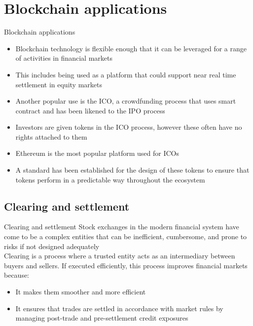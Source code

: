 \documentclass[11pt]{beamer}
\begin{document}
\section{Blockchain applications}

\begin{frame}
	\begin{center}
		\begin{large}
			Blockchain applications
		\end{large}
	\end{center}
\end{frame}


\begin{frame}{}
	\begin{itemize}
		\item Blockchain technology is flexible enough that it can be leveraged for a range of activities in financial markets
		\item This includes being used as a platform that could support near real time settlement in equity markets
		\item Another popular use is the ICO, a crowdfunding process that uses smart contract and has been likened to the IPO process
		\item Investors are given tokens in the ICO process, however these often have no rights attached to them
		\item Ethereum is the most popular platform used for ICOs
		\item A standard has been established for the design of these tokens to ensure that tokens perform in a predictable way throughout the ecosystem
	\end{itemize}
\end{frame}

%

\subsection{Clearing and settlement}

\begin{frame}{Clearing and settlement}
	Stock exchanges in the modern financial system have come to be a complex entities that can be inefficient, cumbersome, and prone to risks if not designed adequately\\ \vspace{3mm}
	Clearing is a process where a trusted entity acts as an intermediary between buyers and sellers. If executed efficiently, this process improves financial markets because:
	\begin{itemize}
		\item It makes them smoother and more efficient
		\item It ensures that trades are settled in accordance with market rules by managing post-trade and pre-settlement credit exposures
	\end{itemize}
\end{frame}
\end{document}
